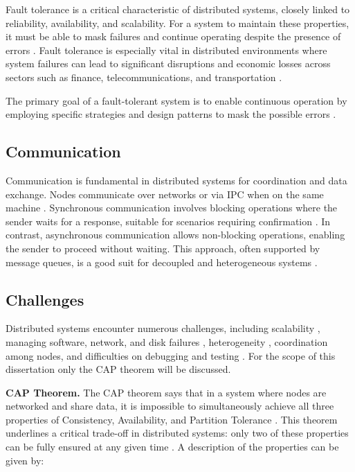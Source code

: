 Fault tolerance is a critical characteristic of distributed systems, closely linked to reliability, availability, and scalability. For a system to maintain these properties, it must be able to mask failures and continue operating despite the presence of errors \cite{Tanenbaum2023}. Fault tolerance is especially vital in distributed environments where system failures can lead to significant disruptions and economic losses across sectors such as finance, telecommunications, and transportation \cite{Sari2015}.

The primary goal of a fault-tolerant system is to enable continuous operation by employing specific strategies and design patterns to mask the possible errors \cite{Kleppmann2017}.

\subsection{Communication}

Communication is fundamental in distributed systems for coordination and data exchange. Nodes communicate over networks or via \gls{IPC} when on the same machine \cite{Vitillo2021}. Synchronous communication involves blocking operations where the sender waits for a response, suitable for scenarios requiring confirmation \cite{Tanenbaum2023, Coulouris2012}. In contrast, asynchronous communication allows non-blocking operations, enabling the sender to proceed without waiting. This approach, often supported by message queues, is a good suit for decoupled and heterogeneous systems \cite{Tanenbaum2023}.

\subsection{Challenges}

Distributed systems encounter numerous challenges, including scalability \cite{Ahmed2013}, managing software, network, and disk failures \cite{Naik2021, aws-challenges-dist-sys}, heterogeneity \cite{Coulouris2012}, coordination among nodes, and difficulties on debugging and testing \cite{Vitillo2021, aws-challenges-dist-sys}. For the scope of this dissertation only the CAP theorem will be discussed.

\textbf{CAP Theorem.} The CAP theorem says that in a system where nodes are networked and share data, it is impossible to simultaneously achieve all three properties of Consistency, Availability, and Partition Tolerance \cite{Tanenbaum2023, Vitillo2021}. This theorem underlines a critical trade-off in distributed systems: only two of these properties can be fully ensured at any given time \cite{ibm-cap-theorem}. A description of the properties can be given by:

